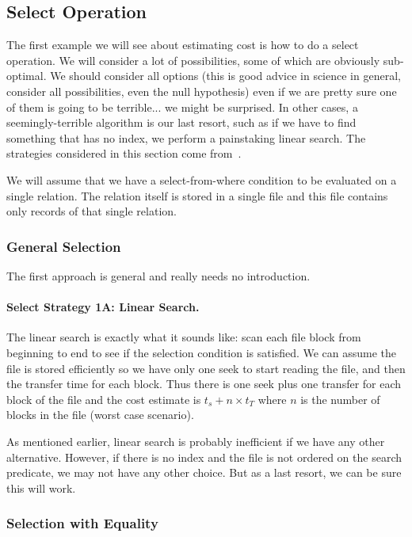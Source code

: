 \subsection*{Select Operation}
The first example we will see about estimating cost is how to do a select operation. We will consider a lot of possibilities, some of which are obviously sub-optimal. We should consider all options (this is good advice in science in general, consider all possibilities, even the null hypothesis) even if we are pretty sure one of them is going to be terrible... we might be surprised. In other cases, a seemingly-terrible algorithm is our last resort, such as if we have to find something that has no index, we perform a painstaking linear search. The strategies considered in this section come from~\cite{dsc}.

We will assume that we have a select-from-where condition to be evaluated on a single relation.  The relation itself is stored in a single file and this file contains only records of that single relation. 

\subsubsection*{General Selection}

The first approach is general and really needs no introduction.

\paragraph{Select Strategy 1A: Linear Search.} The linear search is exactly what it sounds like: scan each file block from beginning to end to see if the selection condition is satisfied. We can assume the file is stored efficiently so we have only one seek to start reading the file, and then the transfer time for each block. Thus there is one seek plus one transfer for each block of the file and the cost estimate is $t_{s} + n \times t_{T}$ where $n$ is the number of blocks in the file (worst case scenario). 

As mentioned earlier, linear search is probably inefficient if we have any other alternative. However, if there is no index and the file is not ordered on the search predicate, we may not have any other choice. But as a last resort, we can be sure this will work.

\subsubsection*{Selection with Equality}

